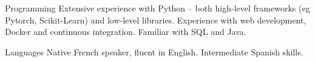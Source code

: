 

\begin{cvskills}

  \cvskill
    {Programming}
    {Extensive experience with Python – both high-level frameworks (eg Pytorch, Scikit-Learn) and low-level libraries.}
  \cvskill
    {}
    {Experience with web development, Docker and continuous integration. Familiar with SQL and Java.}



  \cvskill
    {Languages} %
    {Native French speaker, fluent in English. Intermediate Spanish skills.} %

\end{cvskills}
